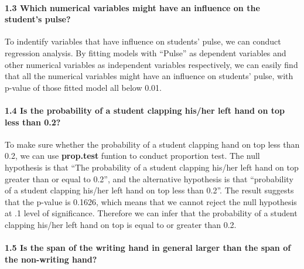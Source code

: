 \documentclass[]{article}
\let\oldparagraph\paragraph
\renewcommand{\paragraph}[1]{\oldparagraph{#1}\mbox{}}
\begin{document}
\hypertarget{which-numerical-variables-might-have-an-influence-on-the-students-pulse}{%
\paragraph{\texorpdfstring{\textbf{1.3 Which numerical variables might
have an influence on the student's pulse?
}}{1.3 Which numerical variables might have an influence on the student's pulse? }}\label{which-numerical-variables-might-have-an-influence-on-the-students-pulse}}

To indentify variables that have influence on students' pulse, we can
conduct regression analysis. By fitting models with ``Pulse'' as
dependent variables and other numerical variables as independent
variables respectively, we can easily find that all the numerical
variables might have an influence on students' pulse, with p-value of
those fitted model all below 0.01.

\hypertarget{is-the-probability-of-a-student-clapping-hisher-left-hand-on-top-less-than-0.2}{%
\paragraph{\texorpdfstring{\textbf{1.4 Is the probability of a student
clapping his/her left hand on top less than 0.2?
}}{1.4 Is the probability of a student clapping his/her left hand on top less than 0.2? }}\label{is-the-probability-of-a-student-clapping-hisher-left-hand-on-top-less-than-0.2}}

To make sure whether the probability of a student clapping hand on top
less than 0.2, we can use \textbf{prop.test} funtion to conduct
proportion test. The null hypothesis is that ``The probability of a
student clapping his/her left hand on top greater than or equal to
0.2'', and the alternative hypothesis is that ``probability of a student
clapping his/her left hand on top less than 0.2''. The result suggests
that the p-value is 0.1626, which means that we cannot reject the null
hypothesis at .1 level of significance. Therefore we can infer that the
probability of a student clapping his/her left hand on top is equal to
or greater than 0.2.

\hypertarget{is-the-span-of-the-writing-hand-in-general-larger-than-the-span-of-the-non-writing-hand}{%
\paragraph{\texorpdfstring{\textbf{1.5 Is the span of the writing hand
in general larger than the span of the non-writing hand?
}}{1.5 Is the span of the writing hand in general larger than the span of the non-writing hand? }}\label{is-the-span-of-the-writing-hand-in-general-larger-than-the-span-of-the-non-writing-hand}}
\end{document}
